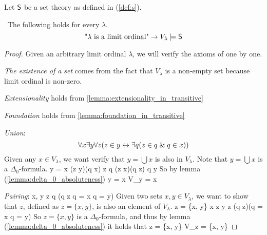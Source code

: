 Let $\sf{S}$ be a set theory as defined in (\ref{def:s}). 
\begin{lemma}\label{lemma:scm_s_is_limit}\
The following holds for every $\lambda$.
\begin{equation}
\mbox{"$\lambda$ is a limit ordinal"} \then V_\lambda \models \sf{S} %
\end{equation}
\end{lemma}

\begin{proof}
Given an arbitrary limit ordinal $\lambda$, we will verify the axioms of  one by one.
\bce[(i)]
\item \emph{The existence of a set} comes from the fact that $V_\lambda$ is a non-empty set because limit ordinal is non-zero.

\item \emph{Extensionality} holds from \ref{lemma:extensionality_in_transitive}

\item \emph{Foundation} holds from \ref{lemma:foundation_in_transitive}


\item \emph{Union}:%
\begin{equation}
\forall x \exists y \forall z (z \in y \leftrightarrow \exists q( z \in q \mathrel{\&} q \in x))
\end{equation}
Given any $x \in V_\lambda$, we want verify that $y = \bigcup x$ is also in $V_\lambda$. Note that $y = \bigcup x$ is a $\Delta_0$-formula.
\beq
y = \bigcup x \iff (\forall z \in y)(\exists q \in x) z \in q \et (\forall z \in x)(\forall q \in z) q \in y
\eeq
So by lemma (\ref{lemma:delta_0_absoluteness})
\beq
y = \bigcup x \iff V_\lambda \models y = \bigcup x
\eeq

\item \emph{Pairing}:%
\beq
\forall x, y \exists z \forall q (q \in z \iff q = x \lor q = y)
\eeq
Given two sets $x, y \in V_\lambda$, we want to show that $z$, defined as $z = \{x, y\}$, is also an element of $V_\lambda$.
\beq
z = \{x, y\} \iff x \in z \et y \in z \et (\forall q \in z)(q = x \lor q = y)
\eeq
So $z = \{x, y\}$ is a $\Delta_0$-formula, and thus by lemma (\ref{lemma:delta_0_absoluteness}) it holds that
\beq
z = \{x, y\} \iff V_\lambda \models z = \{x, y\}
\eeq



\end{proof}
